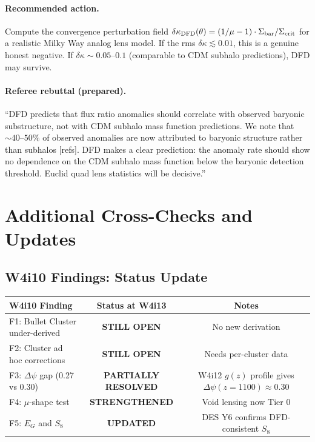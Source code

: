 \documentclass[11pt,a4paper]{article}
\newcommand{\Dpsi}{\Delta\psi}
\begin{document}
\paragraph{Recommended action.}
Compute the convergence perturbation field
$\delta\kappa_{\rm DFD}(\theta) = (1/\mu - 1) \cdot \Sigma_{\rm bar}/\Sigma_{\rm crit}$
for a realistic Milky Way analog lens model.  If the rms
$\delta\kappa \lesssim 0.01$, this is a genuine honest negative.
If $\delta\kappa \sim 0.05$--$0.1$ (comparable to CDM subhalo
predictions), DFD may survive.

\paragraph{Referee rebuttal (prepared).}
``DFD predicts that flux ratio anomalies should correlate with
observed baryonic substructure, not with CDM subhalo mass
function predictions.  We note that $\sim 40$--$50\%$ of observed
anomalies are now attributed to baryonic structure rather than
subhalos [refs].  DFD makes a clear prediction: the anomaly rate
should show no dependence on the CDM subhalo mass function
below the baryonic detection threshold.  Euclid quad lens
statistics will be decisive.''


\section{Additional Cross-Checks and Updates}

\subsection{W4i10 Findings: Status Update}

\begin{center}
\begin{tabular}{lcc}
\toprule
W4i10 Finding & Status at W4i13 & Notes \\
\midrule
F1: Bullet Cluster under-derived & \textbf{STILL OPEN} & No new derivation \\
F2: Cluster ad hoc corrections & \textbf{STILL OPEN} & Needs per-cluster data \\
F3: $\Dpsi$ gap (0.27 vs 0.30) & \textbf{PARTIALLY RESOLVED} & W4i12 $g(z)$ profile gives $\Dpsi(z=1100) \approx 0.30$ \\
F4: $\mu$-shape test & \textbf{STRENGTHENED} & Void lensing now Tier 0 \\
F5: $E_G$ and $S_8$ & \textbf{UPDATED} & DES Y6 confirms DFD-consistent $S_8$ \\
\bottomrule
\end{tabular}
\end{center}
\end{document}
